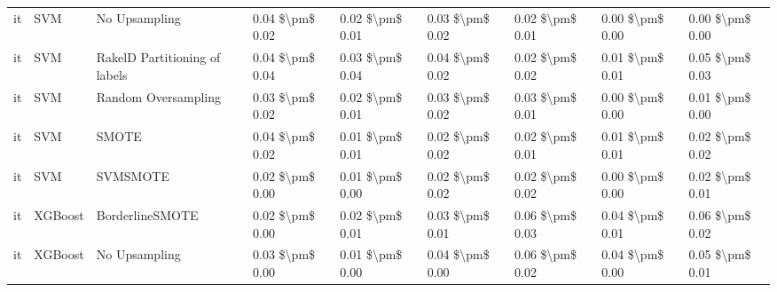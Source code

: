 \begin{tabular}{lllllllll}
      it &                             SVM &                 No Upsampling & 0.04 \$\textbackslash pm\$ 0.02 &           0.02 \$\textbackslash pm\$ 0.01 &       0.03 \$\textbackslash pm\$ 0.02 &        0.02 \$\textbackslash pm\$ 0.01 &                         0.00 \$\textbackslash pm\$ 0.00 &     0.00 \$\textbackslash pm\$ 0.00 \\
      it &                             SVM & RakelD Partitioning of labels & 0.04 \$\textbackslash pm\$ 0.04 &           0.03 \$\textbackslash pm\$ 0.04 &       0.04 \$\textbackslash pm\$ 0.02 &        0.02 \$\textbackslash pm\$ 0.02 &                         0.01 \$\textbackslash pm\$ 0.01 &     0.05 \$\textbackslash pm\$ 0.03 \\
      it &                             SVM &           Random Oversampling & 0.03 \$\textbackslash pm\$ 0.02 &           0.02 \$\textbackslash pm\$ 0.01 &       0.03 \$\textbackslash pm\$ 0.02 &        0.03 \$\textbackslash pm\$ 0.01 &                         0.00 \$\textbackslash pm\$ 0.00 &     0.01 \$\textbackslash pm\$ 0.00 \\
      it &                             SVM &                         SMOTE & 0.04 \$\textbackslash pm\$ 0.02 &           0.01 \$\textbackslash pm\$ 0.01 &       0.02 \$\textbackslash pm\$ 0.02 &        0.02 \$\textbackslash pm\$ 0.01 &                         0.01 \$\textbackslash pm\$ 0.01 &     0.02 \$\textbackslash pm\$ 0.02 \\
      it &                             SVM &                      SVMSMOTE & 0.02 \$\textbackslash pm\$ 0.00 &           0.01 \$\textbackslash pm\$ 0.00 &       0.02 \$\textbackslash pm\$ 0.02 &        0.02 \$\textbackslash pm\$ 0.02 &                         0.00 \$\textbackslash pm\$ 0.00 &     0.02 \$\textbackslash pm\$ 0.01 \\
      it &                         XGBoost &               BorderlineSMOTE & 0.02 \$\textbackslash pm\$ 0.00 &           0.02 \$\textbackslash pm\$ 0.01 &       0.03 \$\textbackslash pm\$ 0.01 &        0.06 \$\textbackslash pm\$ 0.03 &                         0.04 \$\textbackslash pm\$ 0.01 &     0.06 \$\textbackslash pm\$ 0.02 \\
      it &                         XGBoost &                 No Upsampling & 0.03 \$\textbackslash pm\$ 0.00 &           0.01 \$\textbackslash pm\$ 0.00 &       0.04 \$\textbackslash pm\$ 0.00 &        0.06 \$\textbackslash pm\$ 0.02 &                         0.04 \$\textbackslash pm\$ 0.00 &     0.05 \$\textbackslash pm\$ 0.01 \\

\end{tabular}
